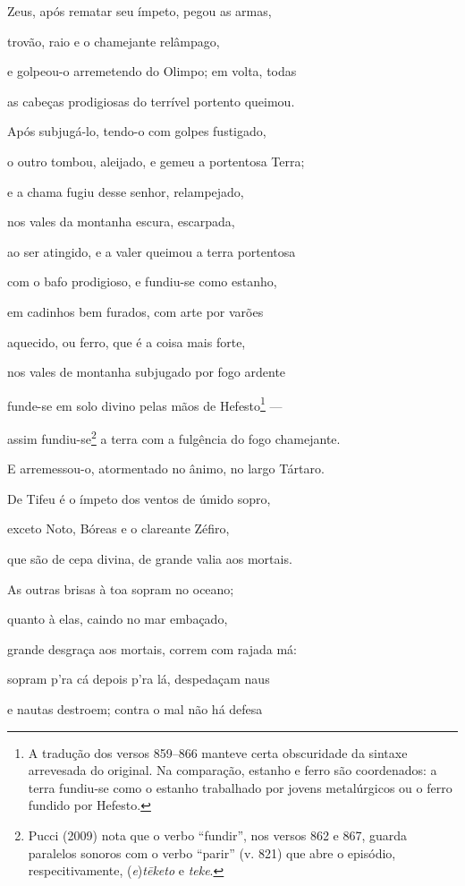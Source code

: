\begin{pages}
\begin{Rightside}
\quad{}Zeus, após rematar seu ímpeto, pegou as armas,

trovão, raio e o chamejante relâmpago,

e golpeou-o arremetendo do Olimpo; em volta, todas 

as cabeças prodigiosas do terrível portento queimou.

Após subjugá-lo, tendo-o com golpes fustigado,

o outro tombou, aleijado, e gemeu a portentosa Terra;

e a chama fugiu desse senhor, relampejado,

nos vales da montanha escura, escarpada, 

ao ser atingido, e a valer queimou a terra portentosa

com o bafo prodigioso, e fundiu-se como estanho,

em cadinhos bem furados, com arte por varões

aquecido, ou ferro, que é a coisa mais forte,

nos vales de montanha subjugado por fogo ardente 

funde-se em solo divino pelas mãos de Hefesto\footnote{A tradução dos versos 859--866 manteve certa obscuridade da sintaxe arrevesada do original. Na comparação, estanho e ferro são coordenados: a terra
fundiu-se como o estanho trabalhado por jovens metalúrgicos ou o ferro
fundido por Hefesto.} ---

assim fundiu-se\footnote{Pucci (2009) nota que o verbo ``fundir'', nos versos 862 e 867, guarda paralelos sonoros com o verbo ``parir'' (v. 821) que abre o
episódio, respecitivamente, (\emph{e})\emph{tēketo} e \emph{teke}.} a terra com a fulgência do fogo chamejante.

E arremessou-o, atormentado no ânimo, no largo Tártaro.

\quad{}De Tifeu é o ímpeto dos ventos de úmido sopro,

exceto Noto, Bóreas e o clareante Zéfiro, 

que são de cepa divina, de grande valia aos mortais.

As outras brisas à toa sopram no oceano;

quanto à elas, caindo no mar embaçado,

grande desgraça aos mortais, correm com rajada má:

sopram p'ra cá depois p'ra lá, despedaçam naus 

e nautas destroem; contra o mal não há defesa


\end{Rightside}
\end{pages}
